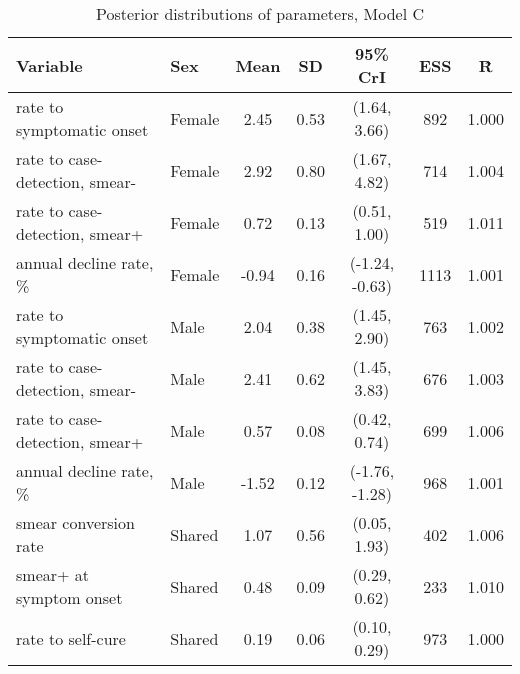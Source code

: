 \begin{table}[h]

\caption{\label{tab:}Posterior distributions of parameters, Model C}
\centering
\begin{tabular}[t]{llccccc}
\toprule
Variable & Sex & Mean & SD & 95\% CrI & ESS & \^{R}\\
\midrule
rate to symptomatic onset & Female & 2.45 & 0.53 & (1.64, 3.66) & 892 & 1.000\\
rate to case-detection, smear- & Female & 2.92 & 0.80 & (1.67, 4.82) & 714 & 1.004\\
rate to case-detection, smear+ & Female & 0.72 & 0.13 & (0.51, 1.00) & 519 & 1.011\\
annual decline rate, \% & Female & -0.94 & 0.16 & (-1.24, -0.63) & 1113 & 1.001\\
\addlinespace
rate to symptomatic onset & Male & 2.04 & 0.38 & (1.45, 2.90) & 763 & 1.002\\
rate to case-detection, smear- & Male & 2.41 & 0.62 & (1.45, 3.83) & 676 & 1.003\\
rate to case-detection, smear+ & Male & 0.57 & 0.08 & (0.42, 0.74) & 699 & 1.006\\
annual decline rate, \% & Male & -1.52 & 0.12 & (-1.76, -1.28) & 968 & 1.001\\
\addlinespace
smear conversion rate & Shared & 1.07 & 0.56 & (0.05, 1.93) & 402 & 1.006\\
smear+ at symptom onset & Shared & 0.48 & 0.09 & (0.29, 0.62) & 233 & 1.010\\
rate to self-cure & Shared & 0.19 & 0.06 & (0.10, 0.29) & 973 & 1.000\\
\bottomrule
\end{tabular}
\end{table}
